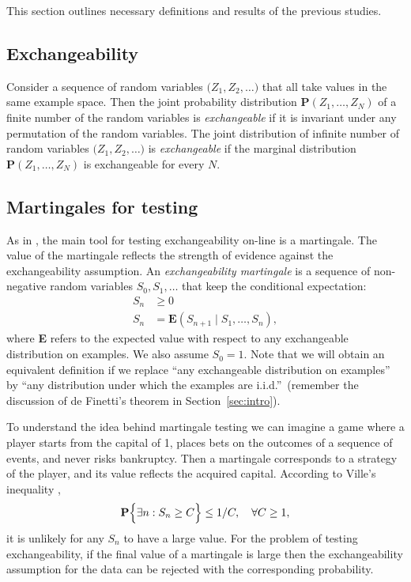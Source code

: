 \documentclass{article}
\theoremstyle{definition}
\begin{document}
This section outlines necessary definitions and results of the previous studies.

\subsection{Exchangeability}

Consider a sequence of random variables $\bigl(Z_1,Z_2,\ldots )$ that all take values
in the same example space.
Then the joint probability distribution $\textbf{P}(Z_1,\ldots,Z_N)$
of a finite number of the random variables is \emph{exchangeable}
if it is invariant under any permutation of the random variables.
The joint distribution of infinite number of random variables $\bigl(Z_1,Z_2,\ldots )$
is \emph{exchangeable} if the marginal distribution $\textbf{P}(Z_1,\ldots,Z_N)$
is exchangeable for every $N$.

\subsection{Martingales for testing}

As in \citet{vovk/nouretdinov/gammerman:2003},
the main tool for testing exchangeability on-line is a martingale.
The value of the martingale reflects the strength of evidence against
the exchangeability assumption. An \emph{exchangeability martingale}
is a sequence of non-negative random variables $S_0,S_1,\ldots$
that keep the conditional expectation:
\begin{align*}
  S_n &\ge 0\\
  S_{n} &= \textbf{E}(S_{n+1}\mid S_1,\ldots,S_{n}),
\end{align*}
where \textbf{E} refers to the expected value
with respect to any exchangeable distribution on examples.
We also assume $S_0 = 1$.
Note that we will obtain an equivalent definition
if we replace ``any exchangeable distribution on examples''
by ``any distribution under which the examples are i.i.d.''\
(remember the discussion of de Finetti's theorem in Section~\ref{sec:intro}).

To understand the idea behind martingale testing we can imagine a game where a player
starts from the capital of 1, places bets on the outcomes of a sequence of events,
and never risks bankruptcy. Then a martingale corresponds to a strategy of the player,
and its value reflects the acquired capital.
According to Ville's inequality \citep[see][p.~100]{ville:1939},
$$\textbf{P}\Bigl\{\exists n: S_n\geq C\Bigr\}\leq 1/C, \quad \forall C\ge1,$$
it is unlikely for any $S_n$ to have a large value.
For the problem of testing exchangeability, if the final value of a martingale is large
then the exchangeability assumption for the data can be rejected with the corresponding probability.
\end{document}
